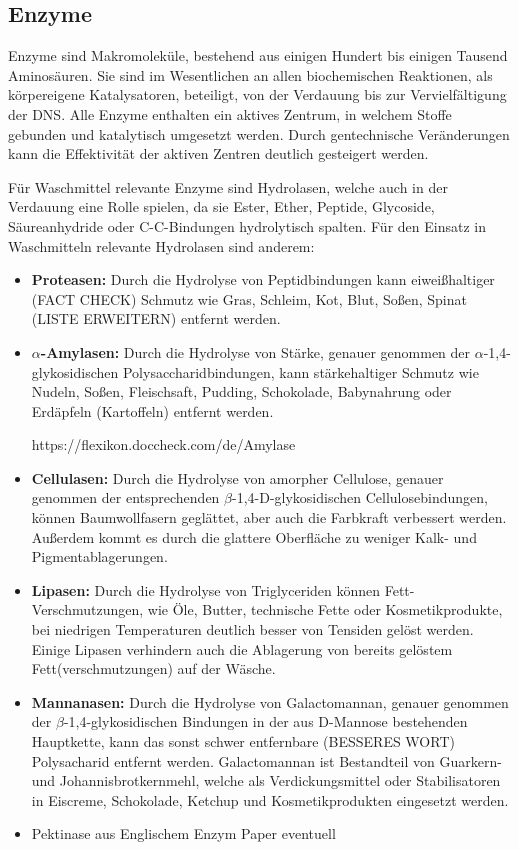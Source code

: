 \documentclass[main.tex]{subfiles}
\begin{document}
\subsection{Enzyme}

Enzyme sind Makromoleküle, bestehend aus einigen Hundert bis einigen Tausend Aminosäuren. Sie sind im Wesentlichen an allen biochemischen Reaktionen, als körpereigene Katalysatoren, beteiligt, von der Verdauung bis zur Vervielfältigung der DNS. Alle Enzyme enthalten ein aktives Zentrum, in welchem Stoffe gebunden und katalytisch umgesetzt werden. Durch gentechnische Veränderungen kann die Effektivität der aktiven Zentren deutlich gesteigert werden.

Für Waschmittel relevante Enzyme sind Hydrolasen, welche auch in der Verdauung eine Rolle spielen, da sie Ester, Ether, Peptide, Glycoside, Säureanhydride oder C-C-Bindungen hydrolytisch spalten. Für den Einsatz in Waschmitteln relevante Hydrolasen sind anderem:

\begin{itemize}
	\item \textbf{Proteasen:}
	Durch die Hydrolyse von Peptidbindungen kann eiweißhaltiger (FACT CHECK) Schmutz wie Gras, Schleim, Kot, Blut, Soßen, Spinat (LISTE ERWEITERN) entfernt werden.
	\item \textbf{$\alpha$-Amylasen:}
	Durch die Hydrolyse von Stärke, genauer genommen der $\alpha$-1,4-glykosidischen Polysaccharidbindungen, kann stärkehaltiger Schmutz wie Nudeln, Soßen, Fleischsaft, Pudding, Schokolade, Babynahrung oder Erdäpfeln (Kartoffeln) entfernt werden.

	https://flexikon.doccheck.com/de/Amylase
	\item \textbf{Cellulasen:}
	Durch die Hydrolyse von amorpher Cellulose, genauer genommen der entsprechenden $\beta$-1,4-D-glykosidischen Cellulosebindungen, können Baumwollfasern geglättet, aber auch die Farbkraft verbessert werden. Außerdem kommt es durch die glattere Oberfläche zu weniger Kalk- und Pigmentablagerungen.
	\item \textbf{Lipasen:}
	Durch die Hydrolyse von Triglyceriden können Fett-Verschmutzungen, wie Öle, Butter, technische Fette oder Kosmetikprodukte, bei niedrigen Temperaturen deutlich besser von Tensiden gelöst werden. Einige Lipasen verhindern auch die Ablagerung von bereits gelöstem Fett(verschmutzungen) auf der Wäsche.
	\item \textbf{Mannanasen:}
	Durch die Hydrolyse von Galactomannan, genauer genommen der $\beta$-1,4-glykosidischen Bindungen in der aus D-Mannose bestehenden Hauptkette, kann das sonst schwer entfernbare (BESSERES WORT) Polysacharid entfernt werden. Galactomannan ist Bestandteil von Guarkern- und Johannisbrotkernmehl, welche als Verdickungsmittel oder Stabilisatoren in Eiscreme, Schokolade, Ketchup und Kosmetikprodukten eingesetzt werden.

	\item Pektinase aus Englischem Enzym Paper eventuell
\end{itemize}
\end{document}
